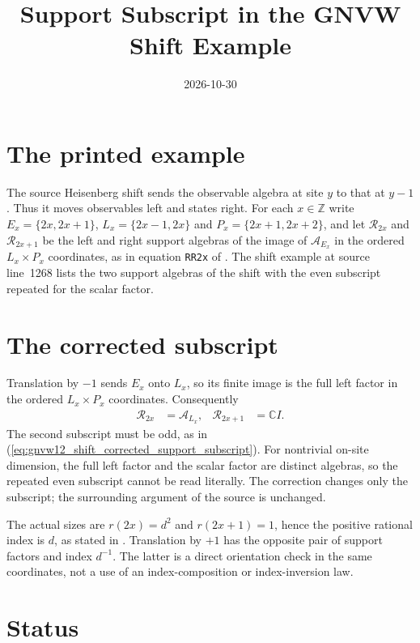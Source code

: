 \documentclass[11pt]{article}
\title{Support Subscript in the GNVW Shift Example}
\author{}
\date{2026-10-30}
\begin{document}
\maketitle
{}

\section{The printed example}

The source Heisenberg shift sends the observable algebra at site $y$ to
that at $y-1$ \cite[lines~609--621]{Gross2012IndexTheory}. Thus it moves
observables left and states right. For each $x\in\mathbb Z$ write
$E_x=\{2x,2x+1\}$, $L_x=\{2x-1,2x\}$ and $P_x=\{2x+1,2x+2\}$, and let
$\mathcal R_{2x}$ and $\mathcal R_{2x+1}$ be the left and right support
algebras of the image of $\mathcal A_{E_x}$ in the ordered
$L_x\times P_x$ coordinates, as in equation \texttt{RR2x} of
\cite[lines~1251--1266]{Gross2012IndexTheory}. The shift example at
source line~1268 lists the two support algebras of the shift with the even
subscript repeated for the scalar factor.

\section{The corrected subscript}

Translation by $-1$ sends $E_x$ onto $L_x$, so its finite image is the
full left factor in the ordered $L_x\times P_x$ coordinates.
Consequently
\begin{align}
    \mathcal R_{2x}   & =\mathcal A_{L_x}, &
    \mathcal R_{2x+1} & =\mathbb C I.
    \label{eq:gnvw12_shift_corrected_support_subscript}
\end{align}
The second subscript must be odd, as in
(\ref{eq:gnvw12_shift_corrected_support_subscript}). For nontrivial
on-site dimension, the full left factor and the scalar factor are
distinct algebras, so the repeated even subscript cannot be read
literally. The correction changes only the subscript; the surrounding
argument of the source is unchanged.

The actual sizes are $r(2x)=d^2$ and $r(2x+1)=1$, hence the positive
rational index is $d$, as stated in
\cite[lines~1325--1329]{Gross2012IndexTheory}. Translation by $+1$ has
the opposite pair of support factors and index $d^{-1}$. The latter is a
direct orientation check in the same coordinates, not a use of an
index-composition or index-inversion law.

\section{Status}
\end{document}
